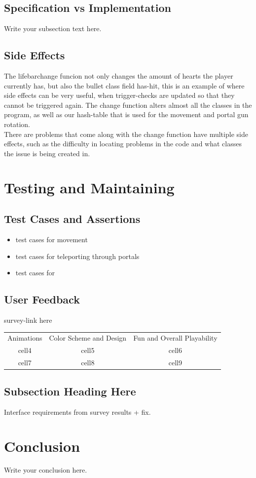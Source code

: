 \documentclass{article}
\begin{document}
	\subsection{Specification vs Implementation}
	Write your subsection text here.
	\subsection{Side Effects}
	The lifebarchange funcion not only changes the amount of hearts the player currently has, but also the bullet class field has-hit, this is an example of where side effects can be very useful, when trigger-checks are updated so that they cannot be triggered again.
	\medskip
	The change function alters almost all the classes in the program, as well as our hash-table that is used for the movement and portal gun rotation. \\
	There are problems that come along with the change function have multiple side effects, such as the difficulty in locating problems in the code and what classes the issue is being created in.
	
	
	\section{Testing and Maintaining}
	\subsection{Test Cases and Assertions}
	\begin{itemize}
		\item test cases for movement
		\item test cases for teleporting through portals
		\item test cases for 
	\end{itemize}
	\subsection{User Feedback}
	survey-link here
	\begin{center}
		\begin{tabular}{ |c|c|c| } 
			\hline
			Animations & Color Scheme and Design & Fun and Overall Playability \\ 
			cell4 & cell5 & cell6 \\ 
			cell7 & cell8 & cell9 \\ 
			\hline
		\end{tabular}
	\end{center}
	
	\subsection{Subsection Heading Here}
	Interface requirements from survey results + fix.
	
	\section{Conclusion}
	Write your conclusion here.
	
\end{document}
